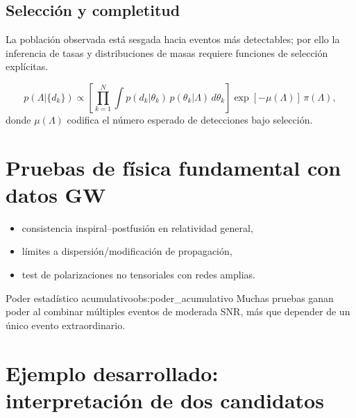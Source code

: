 \subsection{Selección y completitud}

La población observada está sesgada hacia eventos más detectables; por ello la inferencia de tasas y distribuciones de masas requiere funciones de selección explícitas.

\begin{equation}
p(\Lambda|\{d_k\}) \propto
\left[\prod_{k=1}^{N}\int p(d_k|\theta_k)\,p(\theta_k|\Lambda)\,d\theta_k\right]
\exp[-\mu(\Lambda)]\,\pi(\Lambda),
\end{equation}
donde $\mu(\Lambda)$ codifica el número esperado de detecciones bajo selección.

\section{Pruebas de física fundamental con datos GW}
\label{sec:pruebas_fisica_fundamental_gw}

\begin{itemize}[leftmargin=2em]
  \item consistencia inspiral--postfusión en relatividad general,
  \item límites a dispersión/modificación de propagación,
  \item test de polarizaciones no tensoriales con redes amplias.
\end{itemize}

\begin{observacion}{Poder estadístico acumulativo}{obs:poder_acumulativo}
Muchas pruebas ganan poder al combinar múltiples eventos de moderada SNR, más que depender de un único evento extraordinario.
\end{observacion}

\section{Ejemplo desarrollado: interpretación de dos candidatos}
\label{sec:ejemplo_dos_candidatos}

